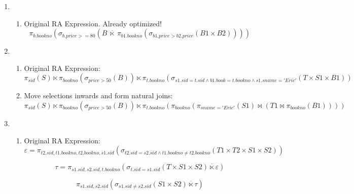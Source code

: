 \documentclass{article}
\begin{document}
\begin{enumerate}
\begin{enumerate}
\begin{enumerate}
    \end{enumerate}

    \item %
    \begin{enumerate}
        \item Original RA Expression. Already optimized! %
        \begin{displaymath}
            \pi_{b.bookno}(\sigma_{b.price >= 80}(B \ \overline{\ltimes}\ \pi_{b1.bookno}(\sigma_{b1.price>b2.price}(B1 \times B2))))
        \end{displaymath}
    \end{enumerate}

    \item %
    \begin{enumerate}
        \item Original RA Expression: %
        \begin{displaymath}
            \pi_{sid}(S) \ltimes
            \pi_{bookno}(\sigma_{price > 50}(B)) \ltimes
            \pi_{t.bookno}(\sigma_{s1.sid=t.sid \wedge b1.book=t.bookno \wedge s1.sname='Eric'}(T \times S1 \times B1)) %
        \end{displaymath}

        \item Move selections inwards and form natural joins:
        \begin{displaymath}
            \pi_{sid}(S) \ltimes
            \pi_{bookno}(\sigma_{price > 50}(B)) \ltimes
            \pi_{t.bookno}(\pi_{bookno}(\pi_{sname='Eric'}(S1) \bowtie (T1 \bowtie \pi_{bookno}(B1)))) %
        \end{displaymath}

    \end{enumerate}

    \item %
    \begin{enumerate}
        \item Original RA Expression: %
        \begin{displaymath}
            \varepsilon = \pi_{t2.sid, t1.bookno, t2.bookno, s1.sid}(\sigma_{t2.sid=s2.sid \wedge t1.bookno \ne t2.bookno}(T1 \times T2 \times S1 \times S2))
        \end{displaymath}

        \begin{displaymath}
            \tau = \pi_{s1.sid, s2.sid, t.bookno}(\sigma_{t.sid=s1.sid}(T \times S1 \times S2) \overline{\ltimes} \varepsilon)
        \end{displaymath}

        \begin{displaymath}
            \pi_{s1.sid, s2.sid}(\sigma_{s1.sid \ne s2.sid}(S1 \times S2) \overline{\ltimes} \tau)
        \end{displaymath}
    \end{enumerate}

\end{enumerate}

\end{enumerate}
\end{document}
